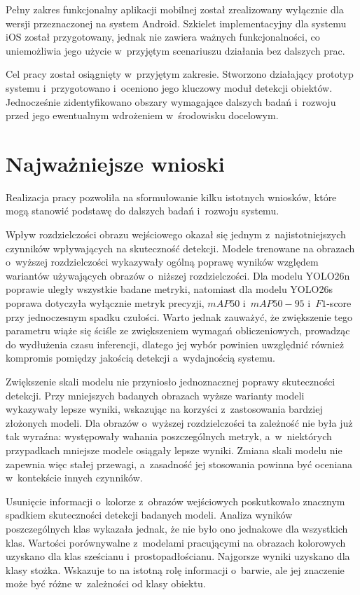 Pełny zakres funkcjonalny aplikacji mobilnej został zrealizowany wyłącznie dla wersji przeznaczonej na system Android. Szkielet implementacyjny dla systemu iOS został przygotowany, jednak nie zawiera ważnych funkcjonalności, co uniemożliwia jego użycie w~przyjętym scenariuszu działania bez dalszych prac.

Cel pracy został osiągnięty w~przyjętym zakresie. Stworzono działający prototyp systemu i~przygotowano i~oceniono jego kluczowy moduł detekcji obiektów. Jednocześnie zidentyfikowano obszary wymagające dalszych badań i~rozwoju przed jego ewentualnym wdrożeniem w~środowisku docelowym.

\section{Najważniejsze wnioski}

Realizacja pracy pozwoliła na sformułowanie kilku istotnych wniosków, które mogą stanowić podstawę do dalszych badań i~rozwoju systemu.

Wpływ rozdzielczości obrazu wejściowego okazał się jednym z~najistotniejszych czynników wpływających na skuteczność detekcji. Modele trenowane na obrazach o~wyższej rozdzielczości wykazywały ogólną poprawę wyników względem wariantów używających obrazów o~niższej rozdzielczości. Dla modelu YOLO26n poprawie uległy wszystkie badane metryki, natomiast dla modelu YOLO26s poprawa dotyczyła wyłącznie metryk precyzji, $mAP50$ i~$mAP50-95$ i~$F1$-score przy jednoczesnym spadku czułości. Warto jednak zauważyć, że zwiększenie tego parametru wiąże się ściśle ze zwiększeniem wymagań obliczeniowych, prowadząc do wydłużenia czasu inferencji, dlatego jej wybór powinien uwzględnić również kompromis pomiędzy jakością detekcji a~wydajnością systemu.

Zwiększenie skali modelu nie przyniosło jednoznacznej poprawy skuteczności detekcji. Przy mniejszych badanych obrazach wyższe warianty modeli wykazywały lepsze wyniki, wskazując na korzyści z~zastosowania bardziej złożonych modeli. Dla obrazów o~wyższej rozdzielczości ta zależność nie była już tak wyraźna: występowały wahania poszczególnych metryk, a~w~niektórych przypadkach mniejsze modele osiągały lepsze wyniki. Zmiana skali modelu nie zapewnia więc stałej przewagi, a~zasadność jej stosowania powinna być oceniana w~kontekście innych czynników.

Usunięcie informacji o~kolorze z~obrazów wejściowych poskutkowało znacznym spadkiem skuteczności detekcji badanych modeli. Analiza wyników poszczególnych klas wykazała jednak, że nie było ono jednakowe dla wszystkich klas. Wartości porównywalne z~modelami pracującymi na obrazach kolorowych uzyskano dla klas sześcianu i~prostopadłościanu. Najgorsze wyniki uzyskano dla klasy stożka. Wskazuje to na istotną rolę informacji o~barwie, ale jej znaczenie może być różne w~zależności od klasy obiektu.

